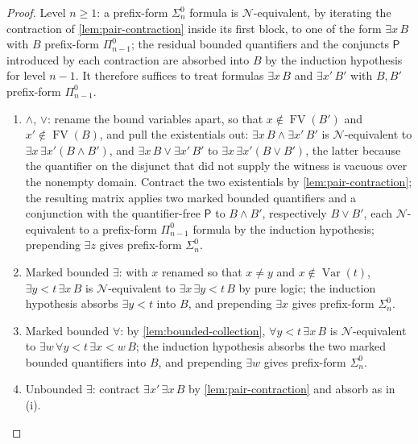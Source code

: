 \documentclass[11pt,oneside,openany]{book}
\theoremstyle{definition}
\theoremstyle{plain}
\theoremstyle{remark}
\newcommand{\FV}{\operatorname{FV}}
\begin{document}
\begin{proof}
Level \(n\geq1\): a prefix-form \(\Sigma^0_n\) formula is
\(\mathcal N\)-equivalent, by iterating the contraction of
\cref{lem:pair-contraction} inside its first block, to one of the form
\(\exists x\,B\) with \(B\) prefix-form \(\Pi^0_{n-1}\); the residual
bounded quantifiers and the conjuncts \(\mathsf P\) introduced by each
contraction are absorbed into \(B\) by the induction hypothesis for level
\(n-1\).  It therefore suffices to treat formulas \(\exists x\,B\) and
\(\exists x'\,B'\) with \(B,B'\) prefix-form \(\Pi^0_{n-1}\).
\begin{enumerate}[label=(\roman*)]
\item \(\land\), \(\lor\): rename the bound variables apart, so that
      \(x\notin\FV(B')\) and \(x'\notin\FV(B)\), and pull the existentials
      out: \(\exists x\,B\land\exists x'\,B'\) is
      \(\mathcal N\)-equivalent to \(\exists x\,\exists x'(B\land B')\),
      and \(\exists x\,B\lor\exists x'\,B'\) to
      \(\exists x\,\exists x'(B\lor B')\), the latter because the
      quantifier on the disjunct that did not supply the witness is
      vacuous over the nonempty domain.  Contract the two existentials by
      \cref{lem:pair-contraction}; the resulting matrix applies two marked
      bounded quantifiers and a conjunction with the quantifier-free
      \(\mathsf P\) to \(B\land B'\), respectively \(B\lor B'\), each
      \(\mathcal N\)-equivalent to a prefix-form \(\Pi^0_{n-1}\) formula
      by the induction hypothesis; prepending \(\exists z\) gives
      prefix-form \(\Sigma^0_n\).
\item Marked bounded \(\exists\): with \(x\) renamed so that \(x\neq y\)
      and \(x\notin\operatorname{Var}(t)\),
      \(\exists y<t\,\exists x\,B\) is \(\mathcal N\)-equivalent to
      \(\exists x\,\exists y<t\,B\) by pure logic; the induction
      hypothesis absorbs \(\exists y<t\) into \(B\), and prepending
      \(\exists x\) gives prefix-form \(\Sigma^0_n\).
\item Marked bounded \(\forall\): by \cref{lem:bounded-collection},
      \(\forall y<t\,\exists x\,B\) is \(\mathcal N\)-equivalent to
      \(\exists w\,\forall y<t\,\exists x<w\,B\); the induction hypothesis
      absorbs the two marked bounded quantifiers into \(B\), and
      prepending \(\exists w\) gives prefix-form \(\Sigma^0_n\).
\item Unbounded \(\exists\): contract
      \(\exists x'\,\exists x\,B\) by \cref{lem:pair-contraction} and
      absorb as in (i).
\end{enumerate}


\end{proof}
\end{document}
